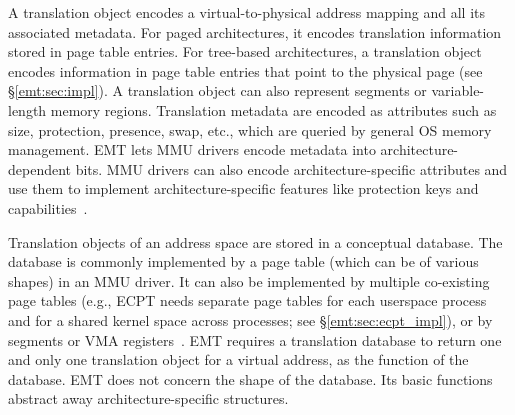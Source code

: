 \label{emt:sss:fg_2}
A translation object encodes a virtual-to-physical address mapping 
	and all its associated metadata. %
For paged architectures, it encodes translation information stored 
	in page table entries.
For tree-based architectures, a translation object encodes information
	in page table entries that point to the physical page
	(see \S\ref{emt:sec:impl}).
A translation object 
	can also represent segments
	or variable-length memory regions.
Translation metadata are encoded as attributes such as size, protection, presence, swap, etc.,
	which are queried by general OS memory management.
EMT lets MMU drivers encode metadata into architecture-dependent bits.
MMU drivers can also encode architecture-specific attributes 
	and use them to implement architecture-specific features
	like protection keys
	and capabilities~\cite{cheri:paper,intel:man,linux:pkey}.


\label{emt:sss:fg_1}
Translation objects of an address space are stored in a conceptual database.
The database is commonly implemented by 
	a page table (which can be of various shapes) in an MMU driver.
It can also be implemented by multiple co-existing page tables 
	(e.g., ECPT needs separate page tables for each userspace process 
	and for a shared kernel space across processes; see \S\ref{emt:sec:ecpt_impl}),
	or by segments or VMA registers~\cite{kanellopoulos2023utopia,self:dmt}.
EMT requires a translation database to return one and only one translation object for a virtual address,
	as the function of the database.
EMT	does not concern the shape of the database.
Its basic functions %
abstract away architecture-specific structures.

